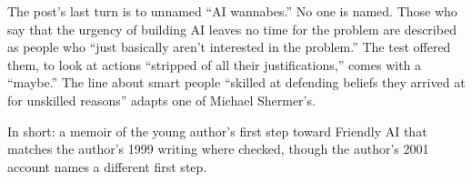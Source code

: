 \begin{afterword}
The post's last turn is to unnamed ``AI wannabes.'' No one is named. Those who say that the urgency of building AI leaves no time for the problem are described as people who ``just basically aren't interested in the problem.'' The test offered them, to look at actions ``stripped of all their justifications,'' comes with a ``maybe.'' The line about smart people ``skilled at defending beliefs they arrived at for unskilled reasons'' adapts one of Michael Shermer's.

In short: a memoir of the young author's first step toward Friendly AI that matches the author's 1999 writing where checked, though the author's 2001 account names a different first step.
\end{afterword}
